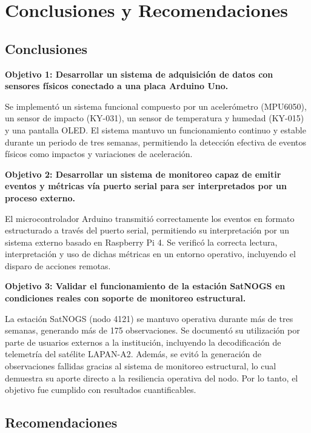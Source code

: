 \documentclass[conference]{IEEEtran}
\begin{document}
\section{Conclusiones y Recomendaciones}

\subsection{Conclusiones}

\textbf{Objetivo 1: Desarrollar un sistema de adquisición de datos con sensores físicos conectado a una placa Arduino Uno.}

Se implementó un sistema funcional compuesto por un acelerómetro (MPU6050), un sensor de impacto (KY-031), un sensor de temperatura y humedad (KY-015) y una pantalla OLED. El sistema mantuvo un funcionamiento continuo y estable durante un periodo de tres semanas, permitiendo la detección efectiva de eventos físicos como impactos y variaciones de aceleración. 

\vspace{0.5em}
\textbf{Objetivo 2: Desarrollar un sistema de monitoreo capaz de emitir eventos y métricas vía puerto serial para ser interpretados por un proceso externo.}

El microcontrolador Arduino transmitió correctamente los eventos en formato estructurado a través del puerto serial, permitiendo su interpretación por un sistema externo basado en Raspberry Pi 4. Se verificó la correcta lectura, interpretación y uso de dichas métricas en un entorno operativo, incluyendo el disparo de acciones remotas. 

\vspace{0.5em}
\textbf{Objetivo 3: Validar el funcionamiento de la estación SatNOGS en condiciones reales con soporte de monitoreo estructural.}

La estación SatNOGS (nodo 4121) se mantuvo operativa durante más de tres semanas, generando más de 175 observaciones. Se documentó su utilización por parte de usuarios externos a la institución, incluyendo la decodificación de telemetría del satélite LAPAN-A2. Además, se evitó la generación de observaciones fallidas gracias al sistema de monitoreo estructural, lo cual demuestra su aporte directo a la resiliencia operativa del nodo. Por lo tanto, el objetivo fue cumplido con resultados cuantificables.

\subsection{Recomendaciones}
\end{document}
